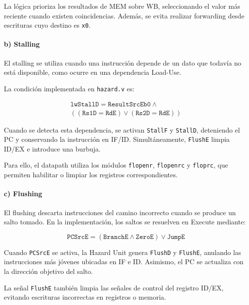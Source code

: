 \documentclass[12pt,a4paper]{article}
\begin{document}
La lógica prioriza los resultados de MEM sobre WB, seleccionando el valor más reciente cuando existen coincidencias. Además, se evita realizar forwarding desde escrituras cuyo destino es \texttt{x0}.

\paragraph{b) Stalling}

El stalling se utiliza cuando una instrucción depende de un dato que todavía no está disponible, como ocurre en una dependencia Load-Use.

La condición implementada en \texttt{hazard.v} es:

\begin{equation}
\begin{split}
\texttt{lwStallD} = \texttt{ResultSrcEb0} \land {}\\
((\texttt{Rs1D}=\texttt{RdE}) \lor
(\texttt{Rs2D}=\texttt{RdE}))
\end{split}
\end{equation}

Cuando se detecta esta dependencia, se activan \texttt{StallF} y \texttt{StallD}, deteniendo el PC y conservando la instrucción en IF/ID. Simultáneamente, \texttt{FlushE} limpia ID/EX e introduce una burbuja.

Para ello, el datapath utiliza los módulos \texttt{flopenr}, \texttt{flopenrc} y \texttt{floprc}, que permiten habilitar o limpiar los registros correspondientes.

\paragraph{c) Flushing}

El flushing descarta instrucciones del camino incorrecto cuando se produce un salto tomado. En la implementación, los saltos se resuelven en Execute mediante:

\begin{equation}
\texttt{PCSrcE} =
(\texttt{BranchE} \land \texttt{ZeroE})
\lor \texttt{JumpE}
\end{equation}

Cuando \texttt{PCSrcE} se activa, la Hazard Unit genera \texttt{FlushD} y \texttt{FlushE}, anulando las instrucciones más jóvenes ubicadas en IF e ID. Asimismo, el PC se actualiza con la dirección objetivo del salto.

La señal \texttt{FlushE} también limpia las señales de control del registro ID/EX, evitando escrituras incorrectas en registros o memoria.
\end{document}
